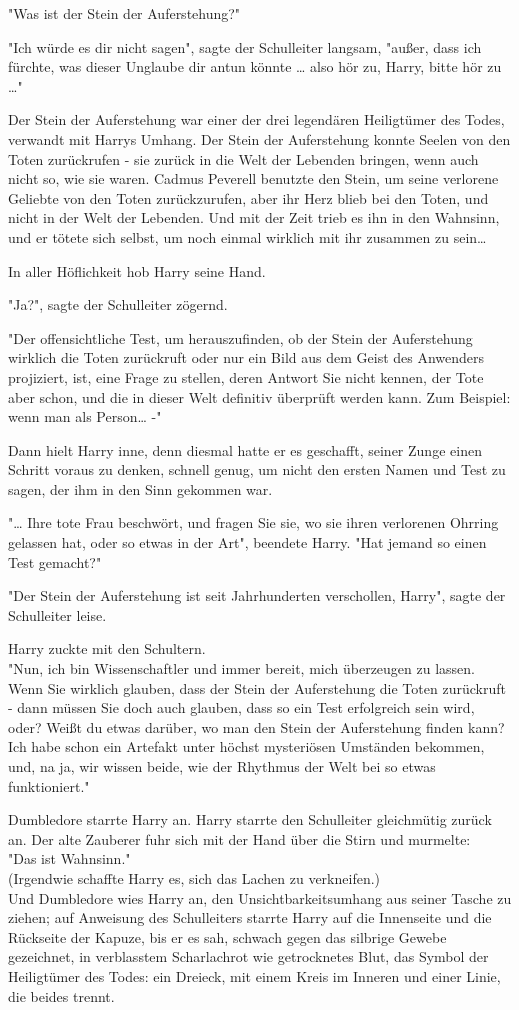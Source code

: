 {"Was ist der Stein der Auferstehung?"

"Ich würde es dir nicht sagen", sagte der Schulleiter langsam, "außer, dass ich fürchte, was dieser Unglaube dir antun könnte … also hör zu, Harry, bitte hör zu …"

Der Stein der Auferstehung war einer der drei legendären Heiligtümer des Todes, verwandt mit Harrys Umhang. Der Stein der Auferstehung konnte Seelen von den Toten zurückrufen - sie zurück in die Welt der Lebenden bringen, wenn auch nicht so, wie sie waren. Cadmus Peverell benutzte den Stein, um seine verlorene Geliebte von den Toten zurückzurufen, aber ihr Herz blieb bei den Toten, und nicht in der Welt der Lebenden. Und mit der Zeit trieb es ihn in den Wahnsinn, und er tötete sich selbst, um noch einmal wirklich mit ihr zusammen zu sein…

In aller Höflichkeit hob Harry seine Hand.

"Ja?", sagte der Schulleiter zögernd.

"Der offensichtliche Test, um herauszufinden, ob der Stein der Auferstehung wirklich die Toten zurückruft oder nur ein Bild aus dem Geist des Anwenders projiziert, ist, eine Frage zu stellen, deren Antwort Sie nicht kennen, der Tote aber schon, und die in dieser Welt definitiv überprüft werden kann. Zum Beispiel: wenn man als Person… -"

Dann hielt Harry inne, denn diesmal hatte er es geschafft, seiner Zunge einen Schritt voraus zu denken, schnell genug, um nicht den ersten Namen und Test zu sagen, der ihm in den Sinn gekommen war.

"… Ihre tote Frau beschwört, und fragen Sie sie, wo sie ihren verlorenen Ohrring gelassen hat, oder so etwas in der Art", beendete Harry. "Hat jemand so einen Test gemacht?"

"Der Stein der Auferstehung ist seit Jahrhunderten verschollen, Harry", sagte der Schulleiter leise.

Harry zuckte mit den Schultern.\\ "Nun, ich bin Wissenschaftler und immer bereit, mich überzeugen zu lassen. Wenn Sie wirklich glauben, dass der Stein der Auferstehung die Toten zurückruft - dann müssen Sie doch auch glauben, dass so ein Test erfolgreich sein wird, oder? Weißt du etwas darüber, wo man den Stein der Auferstehung finden kann? Ich habe schon ein Artefakt unter höchst mysteriösen Umständen bekommen, und, na ja, wir wissen beide, wie der Rhythmus der Welt bei so etwas funktioniert."

Dumbledore starrte Harry an. Harry starrte den Schulleiter gleichmütig zurück an. Der alte Zauberer fuhr sich mit der Hand über die Stirn und murmelte:\\ "Das ist Wahnsinn."\\ (Irgendwie schaffte Harry es, sich das Lachen zu verkneifen.)\\ Und Dumbledore wies Harry an, den Unsichtbarkeitsumhang aus seiner Tasche zu ziehen; auf Anweisung des Schulleiters starrte Harry auf die Innenseite und die Rückseite der Kapuze, bis er es sah, schwach gegen das silbrige Gewebe gezeichnet, in verblasstem Scharlachrot wie getrocknetes Blut, das Symbol der Heiligtümer des Todes: ein Dreieck, mit einem Kreis im Inneren und einer Linie, die beides trennt.

}
